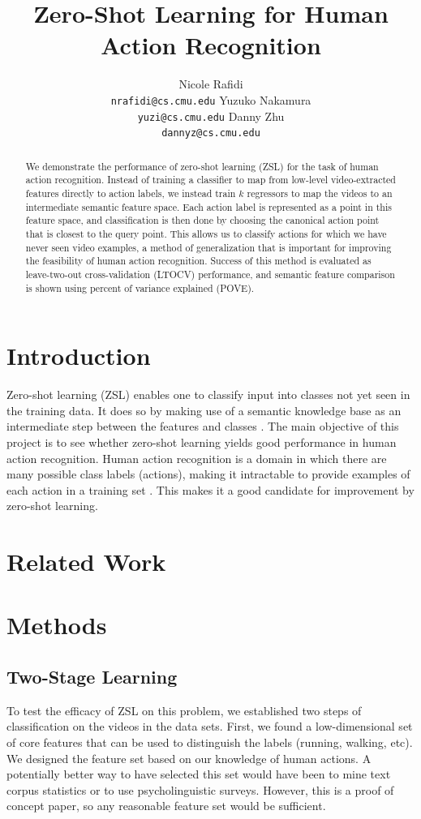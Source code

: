 \documentclass{article}
\title{Zero-Shot Learning for Human Action Recognition}
\author{Nicole Rafidi \\
  \texttt{nrafidi@cs.cmu.edu}
  \And
  Yuzuko Nakamura \\
  \texttt{yuzi@cs.cmu.edu}
  \And
  Danny Zhu \\
  \texttt{dannyz@cs.cmu.edu}
}
\begin{document}
\maketitle
\begin{abstract}
We demonstrate the performance of zero-shot learning (ZSL) for the task of human action recognition. Instead of training a classifier to map from low-level video-extracted features directly to action labels, we instead train $k$ regressors to map the videos to an intermediate semantic feature space.  Each action label is represented as a point in this feature space, and classification is then done by choosing the canonical action point that is closest to the query point.  This allows us to classify actions for which we have never seen video examples, a method of generalization that is important for improving the feasibility of human action recognition. Success of this method is evaluated as leave-two-out cross-validation (LTOCV) performance, and semantic feature comparison is shown using percent of variance explained (POVE).
\end{abstract}
\section{Introduction}
Zero-shot learning (ZSL) enables one to classify input into classes not yet seen in the training data. It does so by making use of a semantic knowledge base as an intermediate step between the features and classes \cite{Palatucci09}. The main objective of this project is to see whether zero-shot learning yields good performance in human action recognition. Human action recognition is a domain in which there are many possible class labels (actions), making it intractable to provide examples of each action in a training set \cite{Poppe10}. This makes it a good candidate for improvement by zero-shot learning.

\section{Related Work}

\section{Methods}

\subsection{Two-Stage Learning}
To test the efficacy of ZSL on this problem, we established two steps of classification on the videos in the data sets. First, we found a low-dimensional set of core features that can be used to distinguish the labels (running, walking, etc).  We designed the feature set based on our knowledge of human actions. A potentially better way to have selected this set would have been to mine text corpus statistics or to use psycholinguistic surveys. However, this is a proof of concept paper, so any reasonable feature set would be sufficient. 
\end{document}
